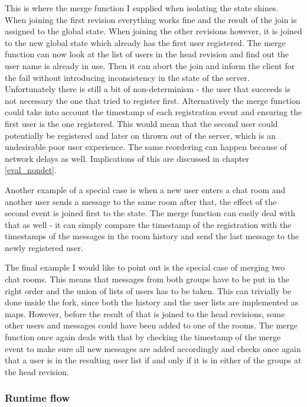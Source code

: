 \documentclass[12pt,twoside,notitlepage]{report}
\begin{document}
{This is where the merge function I supplied when isolating the state shines. When joining the first revision everything works fine and the result of the join is assigned to the global state. When joining the other revisions however, it is joined to the new global state which already has the first user registered. The merge function can now look at the list of users in the head revision and find out the user name is already in use. Then it can abort the join and inform the client for the fail without introducing inconsistency in the state of the server. Unfortunately there is still a bit of non-determinism - the user that succeeds is not necessary the one that tried to register first. Alternatively the merge function could take into account the timestamp of each registration event and ensuring the first user is the one registered. This would mean that the second user could potentially be registered and later on thrown out of the server, which is an undesirable poor user experience. The same reordering can happen because of network delays as well. Implications of this are discussed in chapter \ref{eval_nondet}.

Another example of a special case is when a new user enters a chat room and another user sends a message to the same room after that, the effect of the second event is joined first to the state. The merge function can easily deal with that as well - it can simply compare the timestamp of the registration with the timestamps of the messages in the room history and send the last message to the newly registered user.

The final example I would like to point out is the special case of merging two chat rooms. This means that messages from both groups have to be put in the right order and the union of lists of users has to be taken. This can trivially be done inside the fork, since both the history and the user lists are implemented as maps. However, before the result of that is joined to the head revisions, some other users and messages could have been added to one of the rooms. The merge function once again deals with that by checking the timestamp of the merge event to make sure all new messages are added accordingly and checks once again that a user is in the resulting user list if and only if it is in either of the groups at the head revision.

\subsubsection{Runtime flow}

}
\end{document}
